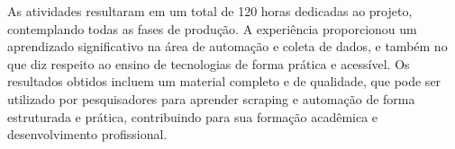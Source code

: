 \documentclass{article}
\begin{document}
As atividades resultaram em um total de 120 horas dedicadas ao projeto, contemplando todas as fases de produção. A experiência proporcionou um aprendizado significativo na área de automação e coleta de dados, e também no que diz respeito ao ensino de tecnologias de forma prática e acessível. Os resultados obtidos incluem um material completo e de qualidade, que pode ser utilizado por pesquisadores para aprender scraping e automação de forma estruturada e prática, contribuindo para sua formação acadêmica e desenvolvimento profissional.
\end{document}
